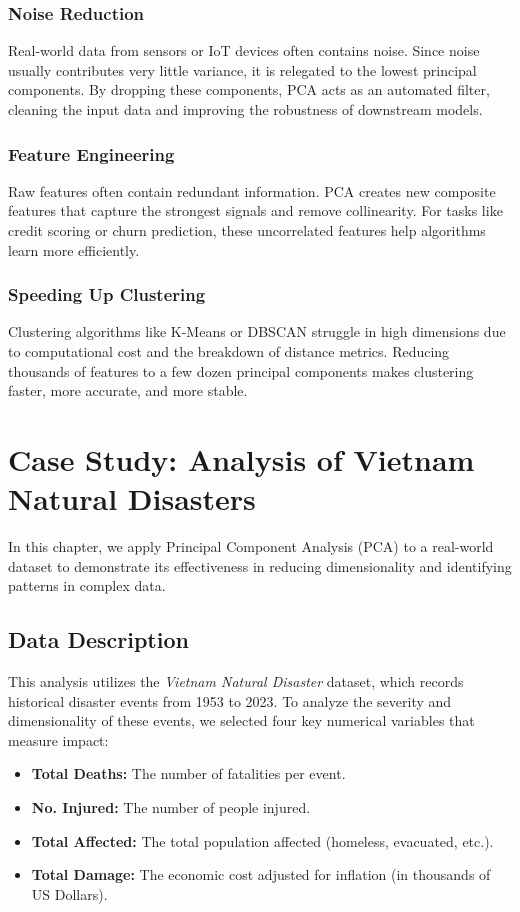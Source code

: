 \documentclass[12pt, a4paper]{report}
\begin{document}
\subsection{Noise Reduction}
Real-world data from sensors or IoT devices often contains noise. Since noise usually contributes very little variance, it is relegated to the lowest principal components. By dropping these components, PCA acts as an automated filter, cleaning the input data and improving the robustness of downstream models.

\subsection{Feature Engineering}
Raw features often contain redundant information. PCA creates new composite features that capture the strongest signals and remove collinearity. For tasks like credit scoring or churn prediction, these uncorrelated features help algorithms learn more efficiently.

\subsection{Speeding Up Clustering}
Clustering algorithms like K-Means or DBSCAN struggle in high dimensions due to computational cost and the breakdown of distance metrics. Reducing thousands of features to a few dozen principal components makes clustering faster, more accurate, and more stable.

\newpage
\chapter{Case Study: Analysis of Vietnam Natural Disasters}

In this chapter, we apply Principal Component Analysis (PCA) to a real-world dataset to demonstrate its effectiveness in reducing dimensionality and identifying patterns in complex data.

\section{Data Description}
This analysis utilizes the \textit{Vietnam Natural Disaster} dataset, which records historical disaster events from 1953 to 2023. To analyze the severity and dimensionality of these events, we selected four key numerical variables that measure impact:
\begin{itemize}
    \item \textbf{Total Deaths:} The number of fatalities per event.
    \item \textbf{No. Injured:} The number of people injured.
    \item \textbf{Total Affected:} The total population affected (homeless, evacuated, etc.).
    \item \textbf{Total Damage:} The economic cost adjusted for inflation (in thousands of US Dollars).
\end{itemize}
\end{document}
